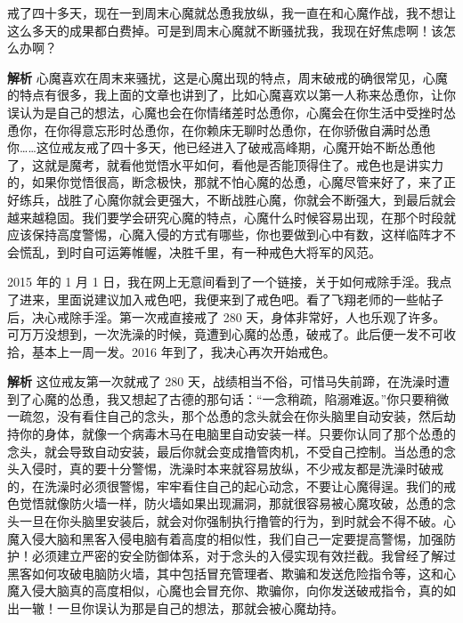 \begin{case}[研究心魔的特点]
    戒了四十多天，现在一到周末心魔就怂恿我放纵，我一直在和心魔作战，我不想让这么多天的成果都白费掉。可是到周末心魔就不断骚扰我，我现在好焦虑啊！该怎么办啊？

    \textbf{解析} 心魔喜欢在周末来骚扰，这是心魔出现的特点，周末破戒的确很常见，心魔的特点有很多，我上面的文章也讲到了，比如心魔喜欢以第一人称来怂恿你，让你误认为是自己的想法，心魔也会在你情绪差时怂恿你，心魔会在你生活中受挫时怂恿你，在你得意忘形时怂恿你，在你赖床无聊时怂恿你，在你骄傲自满时怂恿你……这位戒友戒了四十多天，他已经进入了破戒高峰期，心魔开始不断怂恿他了，这就是魔考，就看他觉悟水平如何，看他是否能顶得住了。戒色也是讲实力的，如果你觉悟很高，断念极快，那就不怕心魔的怂恿，心魔尽管来好了，来了正好练兵，战胜了心魔你就会更强大，不断战胜心魔，你就会不断强大，到最后就会越来越稳固。我们要学会研究心魔的特点，心魔什么时候容易出现，在那个时段就应该保持高度警惕，心魔入侵的方式有哪些，你也要做到心中有数，这样临阵才不会慌乱，到时自可运筹帷幄，决胜千里，有一种戒色大将军的风范。
\end{case}

\begin{case}[研究心魔的特点]
    2015 年的 1 月 1 日，我在网上无意间看到了一个链接，关于如何戒除手淫。我点了进来，里面说建议加入戒色吧，我便来到了戒色吧。看了飞翔老师的一些帖子后，决心戒除手淫。第一次戒直接戒了 280 天，身体非常好，人也乐观了许多。可万万没想到，一次洗澡的时候，竟遭到心魔的怂恿，破戒了。此后便一发不可收拾，基本上一周一发。2016 年到了，我决心再次开始戒色。

    \textbf{解析} 这位戒友第一次就戒了 280 天，战绩相当不俗，可惜马失前蹄，在洗澡时遭到了心魔的怂恿，我又想起了古德的那句话：“一念稍疏，陷溺难返。”你只要稍微一疏忽，没有看住自己的念头，那个怂恿的念头就会在你头脑里自动安装，然后劫持你的身体，就像一个病毒木马在电脑里自动安装一样。只要你认同了那个怂恿的念头，就会导致自动安装，最后你就会变成撸管肉机，不受自己控制。当怂恿的念头入侵时，真的要十分警惕，洗澡时本来就容易放纵，不少戒友都是洗澡时破戒的，在洗澡时必须很警惕，牢牢看住自己的起心动念，不要让心魔得逞。我们的戒色觉悟就像防火墙一样，防火墙如果出现漏洞，那就很容易被心魔攻破，怂恿的念头一旦在你头脑里安装后，就会对你强制执行撸管的行为，到时就会不得不破。心魔入侵大脑和黑客入侵电脑有着高度的相似性，我们自己一定要提高警惕，加强防护！必须建立严密的安全防御体系，对于念头的入侵实现有效拦截。我曾经了解过黑客如何攻破电脑防火墙，其中包括冒充管理者、欺骗和发送危险指令等，这和心魔入侵大脑真的高度相似，心魔也会冒充你、欺骗你，向你发送破戒指令，真的如出一辙！一旦你误认为那是自己的想法，那就会被心魔劫持。
\end{case}

